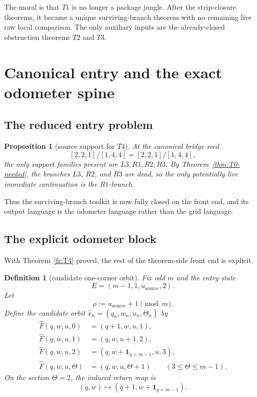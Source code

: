\documentclass[11pt]{article}
\newtheorem{proposition}[theorem]{Proposition}
\newtheorem{definition}[theorem]{Definition}
\newcommand{\CanL}{[2,2,1]}
\newcommand{\CanR}{[1,4,4]}
\newcommand{\CanSeed}{\CanL/\CanR}
\begin{document}
The moral is that \(T1\) is no longer a package jungle.
After the strip-closure theorems, it became a unique surviving-branch theorem
with no remaining live raw local comparison.  The only auxiliary inputs are the
already-closed obstruction theorems \(T2\) and \(T3\).

\section{Canonical entry and the exact odometer spine}

\subsection{The reduced entry problem}

\begin{proposition}[source support for \(T4\)]
\label{prop:T4-source-support}
At the canonical bridge seed
\[
\CanSeed=\CanL/\CanR,
\]
the only support families present are \(L3,R1,R2,R3\).
By Theorem~\ref{thm:T0-needed}, the branches \(L3\), \(R2\), and \(R3\) are
dead, so the only potentially live immediate continuation is the \(R1\)-branch.
\end{proposition}

Thus the surviving-branch toolkit is now fully closed on the front end, and
its output language is the odometer language rather than the grid language.

\subsection{The explicit odometer block}

With Theorem~\ref{fr:T4} proved, the rest of the theorem-side front end is explicit.

\begin{definition}[candidate one-corner orbit]
Fix odd \(m\) and the entry state
\[
E=(m-1,1,u_{\mathrm{source}},2).
\]
Let
\[
\rho:=u_{\mathrm{source}}+1 \pmod m.
\]
Define the candidate orbit \(\widehat x_n=(q_n,w_n,u_n,\Theta_n)\) by
\begin{align*}
\widehat F(q,w,u,0) &= (q+1,w,u,1),\\
\widehat F(q,w,u,1) &= (q,w,u+1,2),\\
\widehat F(q,w,u,2) &= (q,w+\mathbf 1_{q=m-1},u,3),\\
\widehat F(q,w,u,\Theta) &= (q,w,u,\Theta+1)\qquad(3\le \Theta\le m-1).
\end{align*}
On the section \(\Theta=2\), the induced return map is
\[
(q,w)\mapsto(q+1,w+\mathbf 1_{q=m-1}).
\]
\end{definition}
\end{document}
